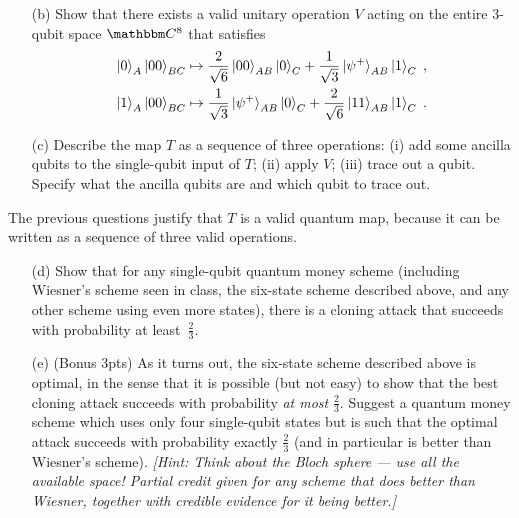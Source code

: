 \documentclass[12pt]{article}
\begin{document}
\begin{enumerate}
\begin{enumerate}
\item[(b)] Show that there exists a valid unitary operation $V$ acting on the entire $3$-qubit space $\C^8$ that satisfies 
\begin{align*}
\ket{0}_A \ket{00}_{BC} \mapsto \frac{2}{\sqrt{6}}\ket{00}_{AB}\ket{0}_C + \frac{1}{\sqrt{3}} \ket{\psi^+}_{AB} \ket{1}_C \;,\\
\ket{1}_A \ket{00}_{BC} \mapsto  \frac{1}{\sqrt{3}} \ket{\psi^+}_{AB}\ket{0}_C + \frac{2}{\sqrt{6}}\ket{11}_{AB}\ket{1}_C \;.
\end{align*}
\item[(c)] Describe the map $T$  as a sequence of three operations: (i) add some ancilla qubits to the single-qubit input of $T$; (ii) apply $V$; (iii) trace out a qubit. Specify what the ancilla qubits are and which qubit to trace out.
\end{enumerate}
The previous questions justify that $T$ is a valid quantum map, because it can be written as a sequence of three valid operations.
\begin{enumerate}
\item[(d)] Show that for any single-qubit quantum money scheme (including Wiesner's scheme seen in class, the six-state scheme described above, and any other scheme using even more states), there is a cloning attack that succeeds with probability at least~$\frac{2}{3}$. 
\item[(e)] (Bonus 3pts) As it turns out, the six-state scheme described above is optimal, in the sense that it is possible (but not easy) to show that the best cloning attack succeeds with probability \emph{at most} $\frac{2}{3}$. Suggest a quantum money scheme which uses only four single-qubit states but is such that the optimal attack succeeds with probability exactly $\frac{2}{3}$ (and in particular is better than Wiesner's scheme). {\em [Hint: Think about the Bloch sphere --- use all the available space! Partial credit given for any scheme that does better than Wiesner, together with credible evidence for it being better.]} 
\end{enumerate}


\end{enumerate}
\end{document}
